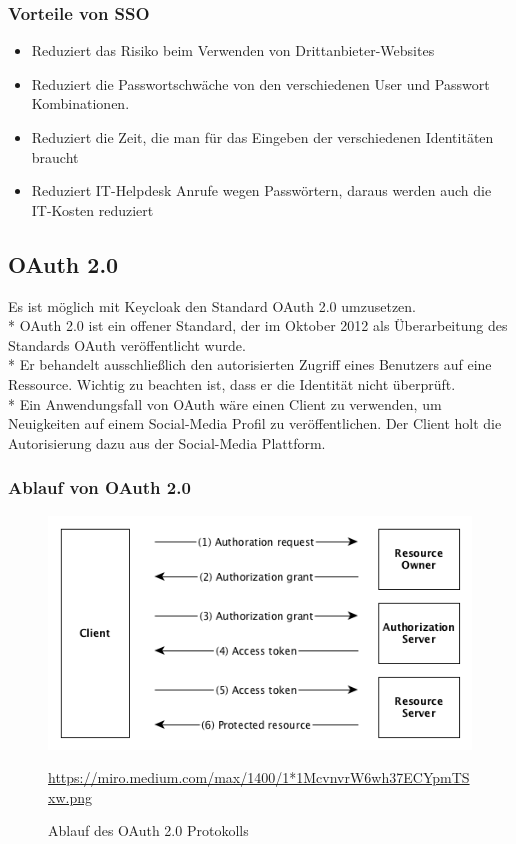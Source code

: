 \subsubsection{Vorteile von SSO}
\begin{itemize}
    \item Reduziert das Risiko beim Verwenden von Drittanbieter-Websites
    \item Reduziert die Passwortschwäche von den verschiedenen User und Passwort Kombinationen.
    \item Reduziert die Zeit, die man für das Eingeben der verschiedenen Identitäten braucht
    \item Reduziert IT-Helpdesk Anrufe wegen Passwörtern, daraus werden auch die IT-Kosten reduziert \cite{KeycloakMakeIT}
\end{itemize}

\subsection{OAuth 2.0}
Es ist möglich mit Keycloak den Standard OAuth 2.0 umzusetzen. \\*
OAuth 2.0 ist ein offener Standard, der im Oktober 2012 als Überarbeitung des Standards OAuth veröffentlicht wurde. \\*
Er behandelt ausschließlich den autorisierten Zugriff eines Benutzers auf eine Ressource. Wichtig zu beachten ist, dass er die Identität nicht überprüft. \\*
Ein Anwendungsfall von OAuth wäre einen Client zu verwenden, um Neuigkeiten auf einem Social-Media Profil zu veröffentlichen. Der Client holt die Autorisierung dazu aus der Social-Media Plattform. \cite{OAuthIonos} \cite{KeycloakCodeCentric}
\pagebreak

\subsubsection{Ablauf von OAuth 2.0}
\begin{figure}[htp]
    \centering
    \includegraphics[scale=0.8]{pics/Ablauf_OAuth2.png}
    \caption{Ablauf des OAuth 2.0 Protokolls}
    \small \url{https://miro.medium.com/max/1400/1*1McvnvrW6wh37ECYpmTSxw.png} 
    \label{fig:impl:OAuth2Protocoll}
\end{figure}

